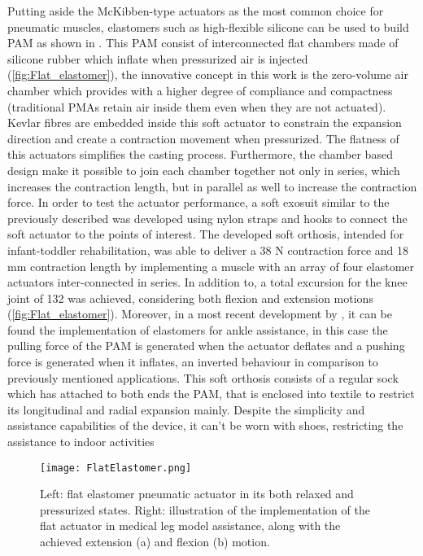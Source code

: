 Putting aside the McKibben-type actuators as the most common choice for pneumatic muscles, elastomers such as high-flexible silicone can be used to build PAM as shown in \cite{Park2014}. This PAM consist of interconnected flat chambers made of silicone rubber which inflate when pressurized air is injected (\autoref{fig:Flat_elastomer}), the innovative concept in this work is the zero-volume air chamber which provides with a higher degree of compliance and compactness (traditional PMAs retain air inside them even when they are not actuated). Kevlar fibres are embedded inside this soft actuator to constrain the expansion direction and create a contraction movement when pressurized. The flatness of this actuators simplifies the casting process. Furthermore, the chamber based design make it possible to join each chamber together not only in series, which increases the contraction length, but in parallel as well to increase the contraction force. In order to test the actuator performance, a soft exosuit similar to the previously described was developed using nylon straps and hooks to connect the soft actuator to the points of interest. The developed soft orthosis, intended for infant-toddler rehabilitation, was able to deliver a 38 N contraction force and 18 mm contraction length by implementing a muscle with an array of four elastomer actuators inter-connected in series. In addition to, a total excursion for the knee joint of 132\textdegree{} was achieved, considering both flexion and extension motions (\autoref{fig:Flat_elastomer}). Moreover, in a most recent development by \cite{Low2016}, it can be found the implementation of elastomers for ankle assistance, in this case the pulling force of the PAM is generated when the actuator deflates and a pushing force is generated when it inflates, an inverted behaviour in comparison to previously mentioned applications. This soft orthosis consists of a regular sock which has attached to both ends the PAM, that is enclosed into textile to restrict its longitudinal and radial expansion mainly. Despite the simplicity and assistance capabilities of the device, it can't be worn with shoes, restricting the assistance to indoor activities
\begin{figure}[hbtp!]
    \centering
    \texttt{[image: FlatElastomer.png]}
    \caption{Left: flat elastomer pneumatic actuator in its both relaxed and pressurized states. Right: illustration of the implementation of the flat actuator in medical leg model assistance, along with the achieved extension (a) and flexion (b) motion. \cite{Park2014} }
    \label{fig:Flat_elastomer}
\end{figure}

